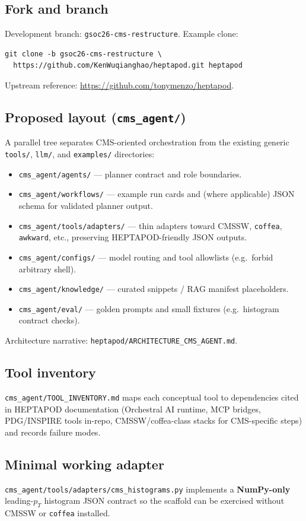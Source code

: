 \documentclass[11pt,a4paper]{article}
\begin{document}
\subsection{Fork and branch}
Development branch: \texttt{gsoc26-cms-restructure}. Example clone:
\begin{verbatim}
git clone -b gsoc26-cms-restructure \
  https://github.com/KenWuqianghao/heptapod.git heptapod
\end{verbatim}
Upstream reference: \url{https://github.com/tonymenzo/heptapod}.

\subsection{Proposed layout (\texttt{cms\_agent/})}
A parallel tree separates CMS-oriented orchestration from the existing generic \texttt{tools/}, \texttt{llm/}, and \texttt{examples/} directories:
\begin{itemize}
  \item \texttt{cms\_agent/agents/} --- planner contract and role boundaries.
  \item \texttt{cms\_agent/workflows/} --- example run cards and (where applicable) JSON schema for validated planner output.
  \item \texttt{cms\_agent/tools/adapters/} --- thin adapters toward CMSSW, \texttt{coffea}, \texttt{awkward}, etc., preserving HEPTAPOD-friendly JSON outputs.
  \item \texttt{cms\_agent/configs/} --- model routing and tool allowlists (e.g.\ forbid arbitrary shell).
  \item \texttt{cms\_agent/knowledge/} --- curated snippets / RAG manifest placeholders.
  \item \texttt{cms\_agent/eval/} --- golden prompts and small fixtures (e.g.\ histogram contract checks).
\end{itemize}
Architecture narrative: \texttt{heptapod/ARCHITECTURE\_CMS\_AGENT.md}.

\subsection{Tool inventory}
\texttt{cms\_agent/TOOL\_INVENTORY.md} maps each conceptual tool to dependencies cited in HEPTAPOD documentation (Orchestral AI runtime, MCP bridges, PDG/INSPIRE tools in-repo, CMSSW/coffea-class stacks for CMS-specific steps) and records failure modes.

\subsection{Minimal working adapter}
\texttt{cms\_agent/tools/adapters/cms\_histograms.py} implements a \textbf{NumPy-only} leading-\(p_T\) histogram JSON contract so the scaffold can be exercised without CMSSW or \texttt{coffea} installed.
\end{document}

